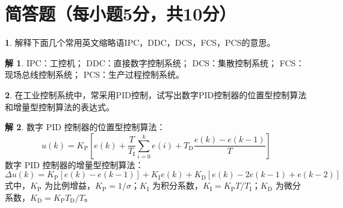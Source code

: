 \documentclass[punct=kaiming,fontset=none]{ctexart}
\theoremstyle{definition}
\newtheorem{ti}{}[section]
\newtheorem*{solution}{解}
\begin{document}
\section{简答题（每小题5分，共10分）}
\begin{ti}
解释下面几个常用英文缩略语IPC，DDC，DCS，FCS，PCS的意思。
\begin{solution}
  IPC：工控机；
  DDC：直接数字控制系统；
  DCS：集散控制系统；
  FCS：现场总线控制系统；
  PCS：生产过程控制系统。
\end{solution}

\end{ti}
\begin{ti}
在工业控制系统中，常采用PID控制，试写出数字PID控制器的位置型控制算法和增量型控制算法的表达式。
\begin{solution}
  数字 PID 控制器的位置型控制算法：
  \[ u(k) = K_{\mathrm{P}} \left[ e(k) + \frac{T}{T_{\mathrm{I}}} \sum_{i=0}^k e(i) + T_{\mathrm{D}} \frac{e(k) - e(k-1)}{T} \right] \]
  数字 PID 控制器的增量型控制算法：
  \[ \Delta u(k) = K_{\mathrm{P}} [e(k) - e(k-1)] + K_{\mathrm{I}} e(k) + K_{\mathrm{D}} [e(k) - 2e(k-1) + e(k-2)] \]
  式中，$K_{\mathrm{P}}$ 为比例增益，$K_{\mathrm{P}} = 1/\sigma$；$K_{\mathrm{I}}$ 为积分系数，$K_{\mathrm{I}} = K_{\mathrm{P}} T/T_{\mathrm{I}}$；$K_{\mathrm{D}}$ 为微分系数，$K_{\mathrm{D}} = K_{\mathrm{P}} T_{\mathrm{D}}/T$。
\end{solution}
\end{ti}
\end{document}
